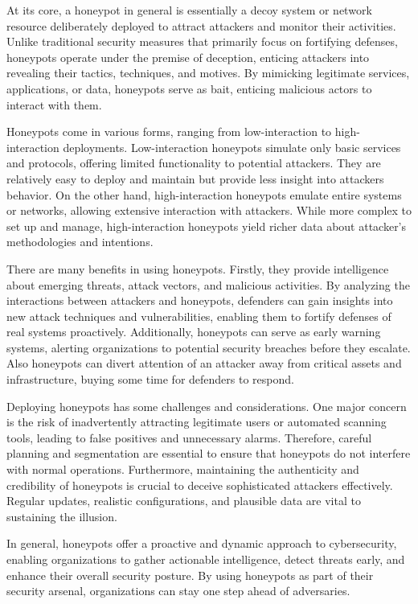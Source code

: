 At its core, a honeypot in general is essentially a decoy system or network resource deliberately deployed to attract attackers and monitor their activities. Unlike traditional security measures that primarily focus on fortifying defenses, honeypots operate under the premise of deception, enticing attackers into revealing their tactics, techniques, and motives. By mimicking legitimate services, applications, or data, honeypots serve as bait, enticing malicious actors to interact with them.

Honeypots come in various forms, ranging from low-interaction to high-interaction deployments. Low-interaction honeypots simulate only basic services and protocols, offering limited functionality to potential attackers. They are relatively easy to deploy and maintain but provide less insight into attackers behavior. On the other hand, high-interaction honeypots emulate entire systems or networks, allowing extensive interaction with attackers. While more complex to set up and manage, high-interaction honeypots yield richer data about attacker's methodologies and intentions.

There are many benefits in using honeypots. Firstly, they provide intelligence about emerging threats, attack vectors, and malicious activities. By analyzing the interactions between attackers and honeypots, defenders can gain insights into new attack techniques and vulnerabilities, enabling them to fortify defenses of real systems proactively. Additionally, honeypots can serve as early warning systems, alerting organizations to potential security breaches before they escalate. Also honeypots can divert attention of an attacker away from critical assets and infrastructure, buying some time for defenders to respond.

Deploying honeypots has some challenges and considerations. One major concern is the risk of inadvertently attracting legitimate users or automated scanning tools, leading to false positives and unnecessary alarms. Therefore, careful planning and segmentation are essential to ensure that honeypots do not interfere with normal operations. Furthermore, maintaining the authenticity and credibility of honeypots is crucial to deceive sophisticated attackers effectively. Regular updates, realistic configurations, and plausible data are vital to sustaining the illusion.

In general, honeypots offer a proactive and dynamic approach to cybersecurity, enabling organizations to gather actionable intelligence, detect threats early, and enhance their overall security posture. By using honeypots as part of their security arsenal, organizations can stay one step ahead of adversaries.

